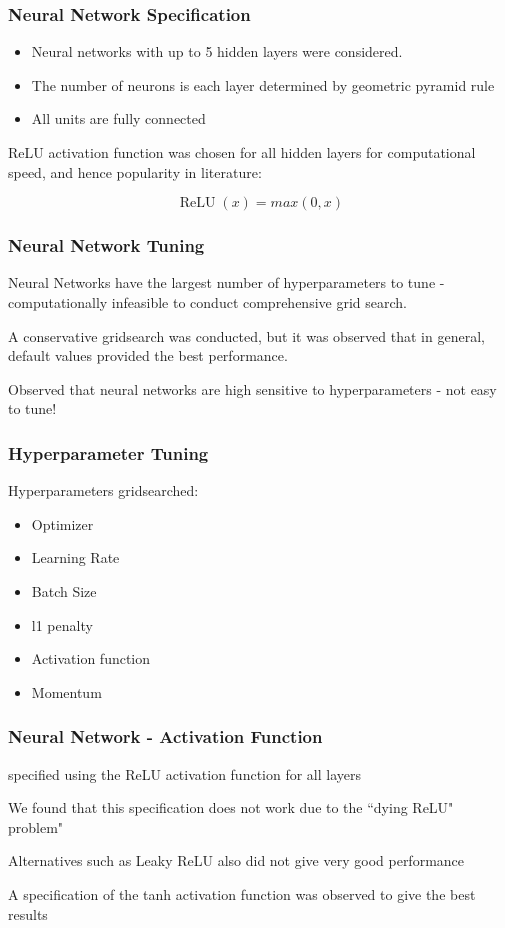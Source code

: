 \documentclass[aspectratio=169]{beamer}
\begin{document}
\begin{frame}
\frametitle{Neural Network Specification}

\begin{itemize}
\item Neural networks with up to 5 hidden layers were considered. 

\item The number of neurons is each layer determined by geometric pyramid rule \citep{masters_practical_1993}

\item All units are fully connected
\end{itemize}

ReLU activation function was chosen for all hidden layers for computational speed, and hence popularity in literature:

\begin{equation}
\operatorname{ReLU}(x) = max(0, x)
\end{equation}
\end{frame}

\begin{frame}
\frametitle{Neural Network Tuning}
Neural Networks have the largest number of hyperparameters to tune - computationally infeasible to conduct comprehensive grid search. 

A conservative gridsearch was conducted, but it was observed that in general, default values provided the best performance.

Observed that neural networks are high sensitive to hyperparameters - not easy to tune!
\end{frame}

\begin{frame}
\frametitle{Hyperparameter Tuning}
Hyperparameters gridsearched:
\begin{itemize}
	\item Optimizer
	\item Learning Rate
	\item Batch Size
	\item l1 penalty
	\item Activation function
	\item Momentum
\end{itemize}
\end{frame}

\begin{frame}
\frametitle{Neural Network - Activation Function}
\cite{gu_empirical_2018} specified using the ReLU activation function for all layers

We found that this specification does not work due to the ``dying ReLU" problem"

Alternatives such as Leaky ReLU also did not give very good performance

A specification of the tanh activation function was observed to give the best results
\end{frame}
\end{document}
